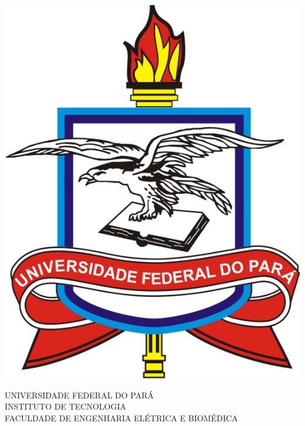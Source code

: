 \documentclass[
	12pt,				%
	openright,			%
	oneside,			%
	a4paper,			%
	english,			%
	brazil				%
	]{abntex2}
\begin{document}

\frenchspacing 


\renewcommand{\imprimircapa}{
\begin{capa}

\center
\includegraphics[scale=0.4]{figures/ufpa_logo.jpg}

 { \ABNTEXchapterfont 
 UNIVERSIDADE FEDERAL DO PARÁ\\
 INSTITUTO DE TECNOLOGIA\\
 FACULDADE DE ENGENHARIA ELÉTRICA E BIOMÉDICA\\}
   \vspace*{4.0cm}
 
 { \ABNTEXchapterfont\large
   \textbf{\imprimirautor}}
   \vspace*{3.0cm}

 {\ABNTEXchapterfont\LARGE
 \textbf{\imprimirtitulo}}

 \vspace*{\fill}
 {\large\imprimirlocal}
 \par
 {\large\imprimirdata}
 \vspace*{1cm}
\end{capa}
}
\imprimircapa
\end{document}
